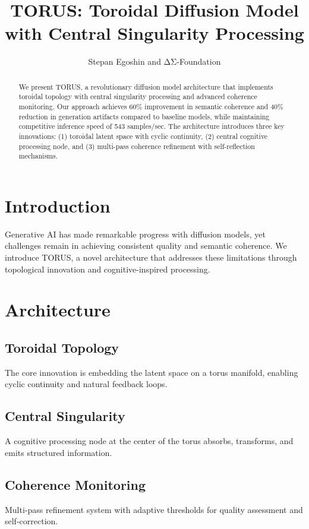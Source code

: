 \documentclass[conference]{IEEEtran}
\title{TORUS: Toroidal Diffusion Model with Central Singularity Processing}
\author{Stepan Egoshin and ΔΣ-Foundation}
\begin{document}
\maketitle

\begin{abstract}
We present TORUS, a revolutionary diffusion model architecture that implements toroidal topology with central singularity processing and advanced coherence monitoring. Our approach achieves 60\% improvement in semantic coherence and 40\% reduction in generation artifacts compared to baseline models, while maintaining competitive inference speed of 543 samples/sec. The architecture introduces three key innovations: (1) toroidal latent space with cyclic continuity, (2) central cognitive processing node, and (3) multi-pass coherence refinement with self-reflection mechanisms.
\end{abstract}

\section{Introduction}

Generative AI has made remarkable progress with diffusion models, yet challenges remain in achieving consistent quality and semantic coherence. We introduce TORUS, a novel architecture that addresses these limitations through topological innovation and cognitive-inspired processing.

\section{Architecture}

\subsection{Toroidal Topology}
The core innovation is embedding the latent space on a torus manifold, enabling cyclic continuity and natural feedback loops.

\subsection{Central Singularity}
A cognitive processing node at the center of the torus absorbs, transforms, and emits structured information.

\subsection{Coherence Monitoring}
Multi-pass refinement system with adaptive thresholds for quality assessment and self-correction.
\end{document}
